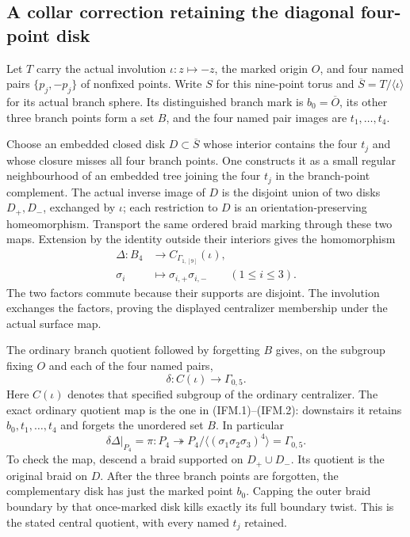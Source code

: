 \subsection{A collar correction retaining the diagonal four-point disk}

Let $T$ carry the actual involution $\iota:z\mapsto-z$, the marked
origin $O$, and four named pairs $\{p_j,-p_j\}$ of nonfixed points.
Write $S$ for this nine-point torus and $\overline S=T/\langle\iota\rangle$
for its actual branch sphere.  Its distinguished branch mark is
$b_0=\overline O$, its other three branch points form a set $B$, and
the four named pair images are $t_1,\ldots,t_4$.

Choose an embedded closed disk $D\subset\overline S$ whose interior
contains the four $t_j$ and whose closure misses all four branch
points.  One constructs it as a small regular neighbourhood of an
embedded tree joining the four $t_j$ in the branch-point complement.
The actual inverse image of $D$ is the disjoint union of two disks
$D_+,D_-$, exchanged by $\iota$; each restriction to $D$ is an
orientation-preserving homeomorphism.  Transport the same ordered
braid marking through these two maps.  Extension by the identity
outside their interiors gives the homomorphism
\[
 \begin{split}
 \Delta:B_4&\longrightarrow C_{\Gamma_{1,[9]}}(\iota),\\
 \sigma_i&\longmapsto\sigma_{i,+}\sigma_{i,-}
                                      \qquad(1\leq i\leq3).
 \end{split}                                                     \tag{DDP.1}
\]
The two factors commute because their supports are disjoint.  The
involution exchanges the factors, proving the displayed centralizer
membership under the actual surface map.

The ordinary branch quotient followed by forgetting $B$ gives, on
the subgroup fixing $O$ and each of the four named pairs,
\[
 \delta:C(\iota)\longrightarrow\Gamma_{0,5}.
                                                               \tag{DDP.2}
\]
Here $C(\iota)$ denotes that specified subgroup of the ordinary
centralizer.  The exact ordinary quotient map is the one in
(IFM.1)--(IFM.2): downstairs it retains $b_0,t_1,\ldots,t_4$ and
forgets the unordered set $B$.  In particular
\[
 \delta\Delta|_{P_4}=\pi:P_4\twoheadrightarrow
        P_4/\langle(\sigma_1\sigma_2\sigma_3)^4\rangle
                    =\Gamma_{0,5}.                             \tag{DDP.3}
\]
To check the map, descend a braid supported on $D_+\cup D_-$.
Its quotient is the original braid on $D$.  After the three branch
points are forgotten, the complementary disk has just the marked
point $b_0$.  Capping the outer braid boundary by that once-marked
disk kills exactly its full boundary twist.  This is the stated
central quotient, with every named $t_j$ retained.

